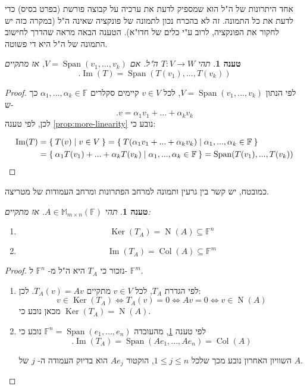\documentclass[12pt]{report}
\theoremstyle{plain}
\newtheorem{proposition}[theorem]{טענה}
\theoremstyle{definition}
\newcommand{\F}{\mathbb{F}}
\newcommand{\M}{\mathbb{M}}
\newcommand{\0}{\mathbf{0}}
\DeclareMathOperator{\Span}{Span}
\DeclareMathOperator{\Col}{Col}
\DeclareMathOperator{\Null}{N}
\DeclareMathOperator{\Ker}{Ker}
\DeclareMathOperator{\Image}{Im}
\begin{document}
אחד היתרונות של ה"ל הוא שמספיק לדעת את ערכיה על קבוצה פורשת (בפרט בסיס) כדי לדעת את כל התמונה. זה לא בהכרח נכון לתמונה של פונקציה שאינה ה"ל (במקרה כזה יש לחקור את הפונקציה, לרוב ע"י כלים של חדו"א). הטענה הבאה מראה שהדרך לחישוב התמונה של ה"ל היא די פשוטה.

\begin{proposition}\label{prop:image-span}
תהי
$T:V\to W$
ה"ל. אם
$V=\Span(v_1,...,v_k)$,
אז מתקיים 
$$.\Image(T)=\Span(T(v_1),...,T(v_k))$$
\end{proposition}

\begin{proof}
לפי הנתון
$V=\Span(v_1,...,v_k)$,
לכל
$v\in V$
קיימים סקלרים
$\alpha_1,...,\alpha_k\in \F$
כך ש-
$$
.v=\alpha_1v_1+...+\alpha_kv_k
$$
לכן, לפי טענה
\ref{prop:more-linearity}
נובע כי:

$$
\begin{aligned}
\Image(T)&=\Set{T(v)|v\in V}=\Set{T(\alpha_1v_1+...+\alpha_kv_k)|\alpha_1,...,\alpha_k\in \F}\\
&=\Set{\alpha_1T(v_1)+...+\alpha_kT(v_k)|\alpha_1,...,\alpha_k\in \F}=\Span(T(v_1),...,T(v_k))
\end{aligned}
$$
\end{proof}

כמובטח, יש קשר בין גרעין ותמונה למרחב הפתרונות ומרחב העמודות של מטריצה.

\begin{proposition}\label{prop:matrix-map}
תהי 
$A\in\M_{m\times n}(\F)$.
אז מתקיים:
\begin{enumerate}[label=\alph*.]
\item
$$\Ker(T_A)=\Null(A)\subseteq \F^n$$

\item
$$\Image(T_A)=\Col(A)\subseteq \F^m$$


\end{enumerate}
\end{proposition}

\begin{proof}
נזכור כי
$T_A$
היא ה"ל מ-
$\F^n$
ל-
$\F^m$.
\begin{enumerate}[label=\alph*.]
\item
לפי הגדרת 
$T_A$,
לכל 
$v\in V$
מתקיים
$T_A(v)=Av$.
לכן:
$$
v\in\Ker(T_A)\iff T_A(v)=0 \iff Av=0 \iff v\in \Null(A)
$$
מכאן נובע כי 
$\Ker(T_A)=\Null(A)$.


\item 
לפי טענה 
\ref{prop:image-span},
מהעובדה 
$\F^n=\Span(e_1,...,e_n)$
נובע כי
$$
.\Image(T_A)=\Span(Ae_1,...,Ae_n)=\Col(A)
$$

השוויון האחרון נובע מכך שלכל 
$1\leq j\leq n$,
הוקטור 
$Ae_j$
הוא בדיוק העמודה ה-
$j$
של
$A$.


\end{enumerate}
\end{proof}
\end{document}
